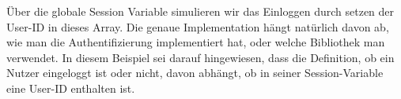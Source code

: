 %                                                                                                                                                                    
%                                                                                                                                                                    
%                                                                                                                                                                    
\begin{ruby}[label=test/functional/job\_controller\_test.rb]
  
    
  \PY{o}{[}\PY{o}{]}  
  
      

   
\end{ruby}

\tddred
Über die globale Session Variable simulieren wir das Einloggen durch setzen der User-ID in dieses Array. Die genaue Implementation hängt natürlich davon ab, wie man die Authentifizierung implementiert hat, oder welche Bibliothek man verwendet. In diesem Beispiel sei darauf hingewiesen, dass die Definition, ob ein Nutzer eingeloggt ist oder nicht, davon abhängt, ob in seiner Session-Variable eine User-ID enthalten ist.

